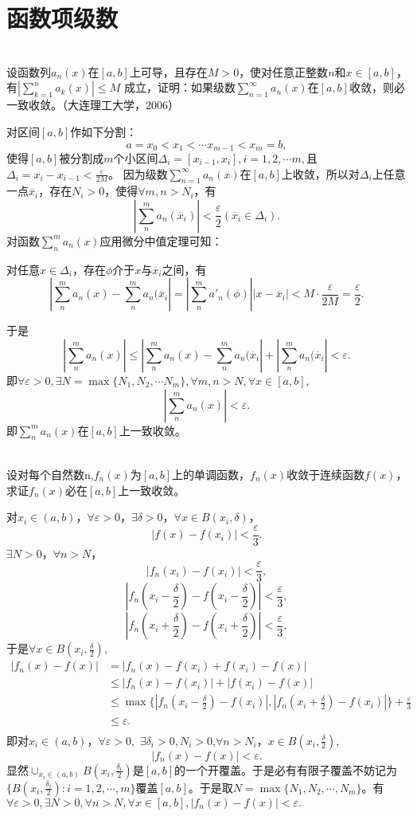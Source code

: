 \section{函数项级数}
\begin{exercise}
\hfill\\
  设函数列${a_n(x)}$在$[a,b]$上可导，且存在$M>0$，使对任意正整数$n$和$x\in[a,b]$，有$\displaystyle|\sum_{k=1}^na_k(x)|\leq M$ 成立，证明：如果级数$\displaystyle\sum_{n=1}^{\infty}a_n(x)$在$[a,b]$收敛，则必一致收敛。（大连理工大学，2006）
  
  对区间$[a,b]$作如下分割：
  $$a=x_0<x_1<\cdots x_{m-1}<x_m=b,$$
  使得$[a,b]$被分割成$m$个小区间$\Delta_i=[x_{i-1},x_i],i=1,2,\cdots m,$且$\Delta_i=x_i-x_{i-1}<\frac{\varepsilon}{2M}$。
  因为级数$\sum_{n=1}^{\infty}a_n(x)$在$[a,b]$上收敛，所以对$\Delta_i$上任意一点$\overline{x}_i$，存在$N_i>0$，使得$\forall m,n>N_i$，有$$|\sum_n^ma_n(\overline{x}_i)|<\frac{\varepsilon}{2}(\overline{x}_i\in\Delta_i).$$
  对函数$\sum_n^ma_n(x)$应用微分中值定理可知：
  
  对任意$x\in\Delta_i$，存在$\phi$介于$x$与$\overline{x}_i$之间，有$$|\sum_n^ma_n(x)-\sum_n^ma_n(\overline{x}_i|=|\sum_n^ma'_n(\phi)||x-\overline{x}_i|<M\cdot\frac{\varepsilon}{2M}=\frac{\varepsilon}{2}.$$
  
  于是$$|\sum_n^ma_n(x)|\leq|\sum_n^ma_n(x)-\sum_n^ma_n(\overline{x}_i|+|\sum_n^ma_n(\overline{x}_i|<\varepsilon.$$
  即$\forall\varepsilon>0,\exists N=\max\{N_1,N_2,\cdots N_m\},\forall m,n>N,\forall x\in[a,b],$$$|\sum_n^ma_n(x)|<\varepsilon.$$
  即$\sum_n^ma_n(x)$在$[a,b]$上一致收敛。
  \end{exercise}  
  \begin{exercise}
  \hfill\\
    设对每个自然数n,$f_n(x)$为$[a,b]$上的单调函数，${f_n(x)}$收敛于连续函数$f(x)$，求证${f_n(x)}$必在$[a,b]$上一致收敛。
  
  对$x_i\in(a,b)$，$\forall\varepsilon>0$，$\exists\delta>0$，$\forall x\in B(x_i,\delta)$，
  $$|f(x)-f(x_i)|<\frac{\varepsilon}3.$$
  $\exists N>0$，$\forall n>N$，
  $$|f_n(x_i)-f(x_i)|<\frac{\varepsilon}{3},$$
  $$|f_n(x_i-\frac{\delta}{2})-f(x_i-\frac{\delta}{2})|<\frac{\varepsilon}{3},$$
  $$|f_n(x_i+\frac{\delta}{2})-f(x_i+\frac{\delta}{2})|<\frac{\varepsilon}{3},$$
  于是$\forall x\in B(x_i,\frac{\delta}{2}),$
  \begin{align*}
  |f_n(x)-f(x)|&=|f_n(x)-f(x_i)+f(x_i)-f(x)|\\
  &\leq|f_n(x)-f(x_i)|+|f(x_i)-f(x)|\\
  &\leq\max\{|f_n(x_i-\frac{\delta}{2})-f(x_i)|,|f_n(x_i+\frac{\delta}{2})-f(x_i)|\}+\frac{\varepsilon}{3}\\
  &\leq\varepsilon.\\
  \end{align*}
  即对$x_i\in(a,b)$，$\forall\varepsilon>0,$ $\exists\delta_i>0,N_i>0$,$\forall n>N_i$，$x\in B(x_i,\frac{\delta}{2})$,
  $$|f_n(x)-f(x)|<\varepsilon.$$
  显然$\cup_{x_i\in(a,b)}B(x_i,\frac{\delta_i}{2})$是$[a,b]$的一个开覆盖。于是必有有限子覆盖不妨记为$\{B(x_i,\frac{\delta_i}{2}):i=1,2,\cdots,m\}$覆盖$[a,b]$。于是取$N=\max\{N_1,N_2,\cdots,N_m\}$。有$\forall\varepsilon>0,\exists N>0,\forall n>N,\forall x\in[a,b],|f_n(x)-f(x)|<\varepsilon.$
  \end{exercise}
  \hfill\\
